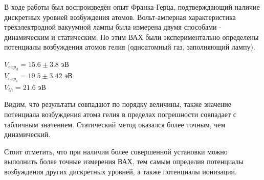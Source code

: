 \documentclass[a4paper]{article}
\begin{document}
В ходе работы был воспроизведён опыт Франка-Герца, подтверждающий наличие дискретных уровней возбуждения атомов. Вольт-амперная характеристика трёхэлектродной вакуумной лампы была измерена двумя способами - динамическим и статическим. По этим ВАХ были экспериментально определены потенциалы возбуждения атомов гелия (одноатомный газ, заполняющий лампу). 
\begin{center}
    $V_{exp}_d = 15.6 \pm 3.8$  эВ \\
    $V_{exp}_s = 19.5 \pm 3.42$ эВ \\
    $V_{th} = 21.6 $ эВ
\end{center}
Видим, что результаты совпадают по порядку величины, также значение потенциала возбуждения атома гелия в пределах погрешности совпадает с табличным значением. Статический метод оказался более точным, чем динамический. \par
Стоит отметить, что при наличии более совершенной установки можно выполнить более точные измерения ВАХ, тем самым определив потенциалы возбуждения других дискретных уровней, а также потенциалы ионизации.
\end{document}
